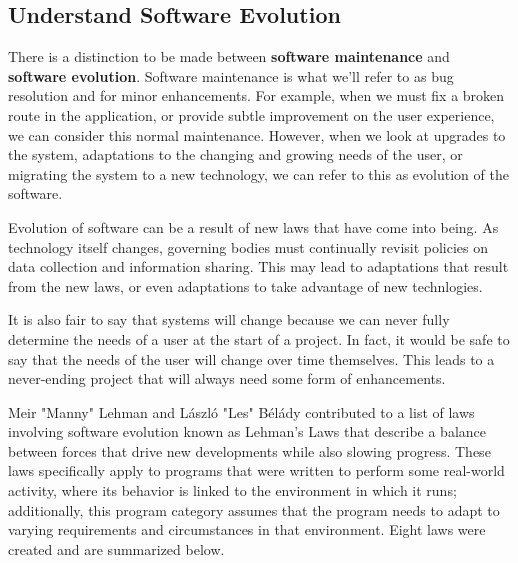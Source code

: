 \documentclass[12pt,conference]{IEEEtran}
\begin{document}
\subsection{Understand Software Evolution}

There is a distinction to be made between \textbf{software maintenance} and \textbf{software evolution}. Software maintenance is what we'll refer to as bug resolution and for minor enhancements. For example, when we must fix a broken route in the application, or provide subtle improvement on the user experience, we can consider this normal maintenance. However, when we look at upgrades to the system, adaptations to the changing and growing needs of the user, or migrating the system to a new technology, we can refer to this as evolution of the software.

Evolution of software can be a result of new laws that have come into being. As technology itself changes, governing bodies must continually revisit policies on data collection and information sharing. This may lead to adaptations that result from the new laws, or even adaptations to take advantage of new technlogies.

It is also fair to say that systems will change because we can never fully determine the needs of a user at the start of a project. In fact, it would be safe to say that the needs of the user will change over time themselves. This leads to a never-ending project that will always need some form of enhancements.

Meir "Manny" Lehman and László "Les" Bélády contributed to a list of laws involving software evolution known as Lehman's Laws that describe a balance between forces that drive new developments while also slowing progress. These laws specifically apply to programs that were written to perform some real-world activity, where its behavior is linked to the environment in which it runs; additionally, this program category assumes that the program needs to adapt to varying requirements and circumstances in that environment. Eight laws were created and are summarized below.
\cite{wiki:lehmans-laws}
\end{document}
